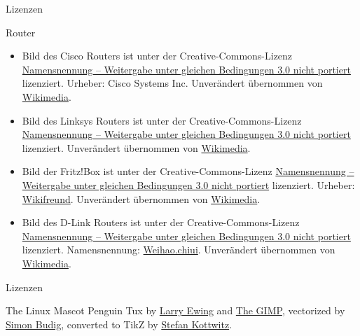\documentclass[t]{beamer}
\begin{document}

\begin{frame}{Lizenzen}
    \begin{block}{Router}
        \small
        \begin{itemize}
            \item Bild des Cisco Routers ist unter der Creative-Commons-Lizenz
                \href{https://creativecommons.org/licenses/by-sa/3.0/deed.de}{Namensnennung
                – Weitergabe unter gleichen Bedingungen 3.0 nicht portiert}
                lizenziert. Urheber: Cisco Systems Inc. Unverändert übernommen
                von
                \href{https://commons.wikimedia.org/wiki/File:Cisco7600seriesrouter.jpg}{Wikimedia}.
            \item Bild des Linksys Routers ist unter der
                Creative-Commons-Lizenz
                \href{https://creativecommons.org/licenses/by-sa/3.0/deed.de}{Namensnennung
                – Weitergabe unter gleichen Bedingungen 3.0 nicht portiert}
                lizenziert. Unverändert übernommen von
                \href{https://commons.wikimedia.org/wiki/File:Linksys_BEFSR41_Router_20040321.jpg}{Wikimedia}.
            \item Bild der Fritz!Box ist unter der Creative-Commons-Lizenz
                \href{https://creativecommons.org/licenses/by-sa/3.0/deed.de}{Namensnennung
                – Weitergabe unter gleichen Bedingungen 3.0 nicht portiert}
                lizenziert. Urheber:
                \href{https://commons.wikimedia.org/wiki/User:Wikifreund}{Wikifreund}.
                Unverändert übernommen von
                \href{https://commons.wikimedia.org/wiki/File:FRITZ!Box_6490_Cable.JPG}{Wikimedia}.
            \item Bild des D-Link Routers ist unter der Creative-Commons-Lizenz
                \href{https://creativecommons.org/licenses/by-sa/3.0/deed.de}{Namensnennung
                – Weitergabe unter gleichen Bedingungen 3.0 nicht portiert}
                lizenziert. Namensnennung:
                \href{https://zh.wikipedia.org/wiki/User:Weihao.chiu}{Weihao.chiui}.
                Unverändert übernommen von
                \href{https://commons.wikimedia.org/wiki/File:D-Link_DI-524.jpg}{Wikimedia}.
        \end{itemize}
        \normalsize
    \end{block}
\end{frame}

\begin{frame}{Lizenzen}
    \begin{block}{The Linux Mascot}
        Penguin Tux by \href{mailto:lewing@isc.tamu.edu}{Larry Ewing}
        and \href{http://isc.tamu.edu/~lewing/linux/}{The GIMP},
        vectorized by \href{http://www.home.unix-ag.org/simon/}{Simon Budig},
        converted to TikZ by
        \href{http://www.texample.net/weblog/2012/apr/28/tux-tex-tikz/}{Stefan Kottwitz}.
    \end{block}
\end{frame}
\end{document}
